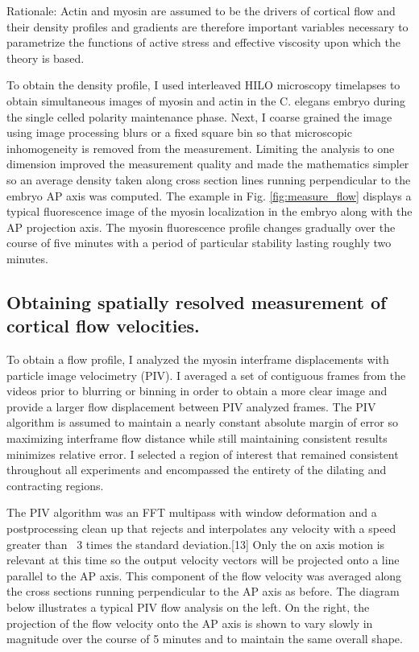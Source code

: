 Rationale: Actin and myosin are assumed to be the drivers of cortical flow and their density profiles
and gradients are therefore important variables necessary to parametrize the functions of active stress
and effective viscosity upon which the theory is based.

To obtain the density profile, I used interleaved HILO microscopy timelapses to obtain
simultaneous images of myosin and actin in the C. elegans embryo during the single celled polarity
maintenance phase. Next, I coarse grained the image using image processing blurs or a fixed square
bin so that microscopic inhomogeneity is removed from the measurement. Limiting the analysis to one
dimension improved the measurement quality and made the mathematics simpler so an average
density taken along cross section lines running perpendicular to the embryo AP axis was computed.
The example in Fig. \ref{fig:measure_flow} displays a typical fluorescence image of the myosin localization in the embryo
along with the AP projection axis. The myosin fluorescence profile changes gradually
over the course of five minutes with a period of particular stability lasting roughly two minutes.





\subsection{Obtaining spatially resolved measurement of cortical flow velocities.}
To obtain a flow profile, I analyzed the myosin interframe displacements with
particle image velocimetry (PIV). I averaged a set of contiguous frames from the videos prior to blurring or binning in order to obtain a more clear image and provide a larger flow
displacement between PIV analyzed frames. The PIV algorithm is assumed to maintain a nearly
constant absolute margin of error so maximizing interframe flow distance while still maintaining
consistent results minimizes relative error. I selected a region of interest that remained
consistent throughout all experiments and encompassed the entirety of the dilating and contracting
regions.

The PIV algorithm was an FFT multipass with window deformation and a postprocessing
clean up that rejects and interpolates any velocity with a speed greater than ~3 times the standard
deviation.[13] Only the on axis motion is relevant at this time so the output velocity vectors will be
projected onto a line parallel to the AP axis. This component of the flow velocity was averaged
along the cross sections running perpendicular to the AP axis as before. The diagram below illustrates
a typical PIV flow analysis on the left. On the right, the projection of the flow velocity onto the AP
axis is shown to vary slowly in magnitude over the course of 5 minutes and to maintain the same
overall shape.




